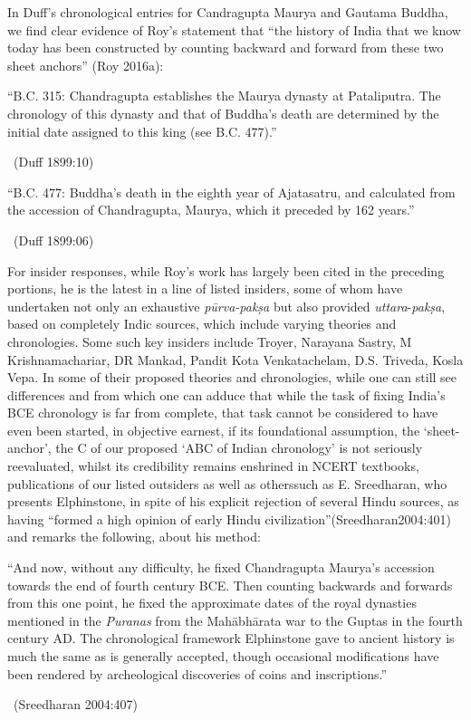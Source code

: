 In Duff’s chronological entries for Candragupta Maurya and Gautama Buddha, we find clear evidence of Roy’s statement that “the history of India that we know today has been constructed by counting backward and forward from these two sheet anchors” (Roy 2016a):

\begin{myquote}
“B.C. 315: Chandragupta establishes the Maurya dynasty at Pataliputra. The chronology of this dynasty and that of Buddha's death are determined by the initial date assigned to this king (see B.C. 477).” 

~\hfill (Duff 1899:10)
\end{myquote}

\begin{myquote}
“B.C. 477: Buddha's death in the eighth year of Ajatasatru, and calculated from the accession of Chandragupta, Maurya, which it preceded by 162 years.” 

~\hfill (Duff 1899:06)
\end{myquote}

For insider responses, while Roy’s work has largely been cited in the preceding portions, he is the latest in a line of listed insiders, some of whom have undertaken not only an exhaustive \textit{pūrva-pakṣa} but also provided \textit{uttara}-\textit{pakṣa}, based on completely Indic sources, which include varying theories and chronologies. Some such key insiders include Troyer, Narayana Sastry, M Krishnamachariar, DR Mankad, Pandit Kota Venkatachelam, D.S. Triveda, Kosla Vepa. In some of their proposed theories and chronologies, while one can still see differences and from which one can adduce that while the task of fixing India’s BCE chronology is far from complete, that task cannot be considered to have even been started, in objective earnest, if its foundational assumption, the ‘sheet-anchor’, the C of our proposed ‘ABC of Indian chronology’ is not seriously reevaluated, whilst its credibility remains enshrined in NCERT textbooks, publications of our listed outsiders as well as otherssuch as E. Sreedharan, who presents Elphinstone, in spite of his explicit rejection of several Hindu sources, as having “formed a high opinion of early Hindu civilization”(Sreedharan2004:401) and remarks the following, about his method:

\begin{myquote}
“And now, without any difficulty, he fixed Chandragupta Maurya’s accession towards the end of fourth century BCE. Then counting backwards and forwards from this one point, he fixed the approximate dates of the royal dynasties mentioned in the \textit{Puranas} from the Mahābhārata war to the Guptas in the fourth century AD. The chronological framework Elphinstone gave to ancient history is much the same as is generally accepted, though occasional modifications have been rendered by archeological discoveries of coins and inscriptions.” 

~\hfill (Sreedharan 2004:407)
\end{myquote}

